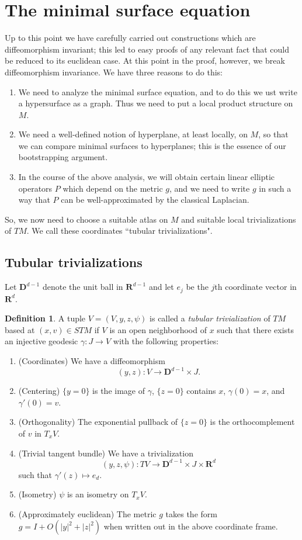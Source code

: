 \documentclass[reqno,12pt,letterpaper]{amsart}
\newcommand{\RR}{\mathbf{R}}
\newcommand{\DD}{\mathbf{D}}
\newcommand{\dfn}[1]{\emph{#1}\index{#1}}
\theoremstyle{definition}
\newtheorem{definition}[theorem]{Definition}
\numberwithin{equation}{section}
\begin{document}
\section{The minimal surface equation}
Up to this point we have carefully carried out constructions which are diffeomorphism invariant; this led to easy proofs of any relevant fact that could be reduced to its euclidean case.
At this point in the proof, however, we break diffeomorphism invariance.
We have three reasons to do this:
\begin{enumerate}
\item We need to analyze the minimal surface equation, and to do this we ust write a hypersurface as a graph. Thus we need to put a local product structure on $M$.
\item We need a well-defined notion of hyperplane, at least locally, on $M$, so that we can compare minimal surfaces to hyperplanes; this is the essence of our bootstrapping argument.
\item In the course of the above analysis, we will obtain certain linear elliptic operators $P$ which depend on the metric $g$, and we need to write $g$ in such a way that $P$ can be well-approximated by the classical Laplacian.
\end{enumerate}
So, we now need to choose a suitable atlas on $M$ and suitable local trivializations of $TM$.
We call these coordinates ``tubular trivializations".

\subsection{Tubular trivializations}
Let $\DD^{d - 1}$ denote the unit ball in $\RR^{d - 1}$ and let $e_j$ be the $j$th coordinate vector in $\RR^d$.

\begin{definition}
A tuple $V = (V, y, z, \psi)$ is called a \dfn{tubular trivialization} of $TM$ based at $(x, v) \in STM$ if $V$ is an open neighborhood of $x$ such that there exists an injective geodesic $\gamma: J \to V$ with the following properties:
\begin{enumerate}
\item (Coordinates) We have a diffeomorphism
$$(y, z): V \to \DD^{d - 1} \times J.$$
\item (Centering) $\{y = 0\}$ is the image of $\gamma$, $\{z = 0\}$ contains $x$, $\gamma(0) = x$, and $\gamma'(0) = v$.
\item (Orthogonality) The exponential pullback of $\{z = 0\}$ is the orthocomplement of $v$ in $T_x V$.
\item (Trivial tangent bundle) We have a trivialization
$$(y, z, \psi): TV \to \DD^{d - 1} \times J \times \RR^d$$
such that $\gamma'(z) \mapsto e_d$.
\item (Isometry) $\psi$ is an isometry on $T_xV$.
\item (Approximately euclidean) The metric $g$ takes the form $g = I + O(|y|^2 + |z|^2)$ when written out in the above coordinate frame.
\end{enumerate}
\end{definition}
\end{document}
